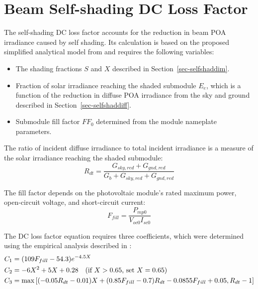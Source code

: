 \documentclass[12pt,letterpaper]{article}
\begin{document}

\section{Beam Self-shading DC Loss Factor} \label{sec-selfshaddc}

The self-shading DC loss factor accounts for the reduction in beam POA irradiance caused by self shading. Its calculation is based on the proposed simplified analytical model from \citep{deline2013a} and requires the following variables:
\begin{itemize}
\item The shading fractions $S$ and $X$ described in Section~\ref{sec-selfshaddim}.
\item Fraction of solar irradiance reaching the shaded submodule $E_e$, which is a function of the reduction in diffuse POA irradiance from the sky and ground described in Section~\ref{sec-selfshaddiff}.
\item Submodule fill factor $\mathit{FF}_0$ determined from the module nameplate parameters.
\end{itemize}

The ratio of incident diffuse irradiance to total incident irradiance is a measure of the solar irradiance reaching the shaded submodule:
\begin{equation}
R_{dt} = \frac{G_{sky,red}+G_{gnd,red}}{G_b+G_{sky,red}+G_{gnd,red}}
\end{equation}

The fill factor depends on the photovoltaic module's rated maximum power, open-circuit voltage, and short-circuit current:
\begin{equation}
F_{fill}=\frac{P_{mp0}}{V_{oc0}I_{sc0}}
\end{equation}

The DC loss factor equation requires three coefficients, which were determined using the empirical analysis described in \citet{deline2013a}:
\begin{align}
C_1 &= (109F_{fill}-54.3)e^{-4.5X} \notag\\
C_2 &= -6X^2+5X+0.28 \quad \text{(if $X>0.65$, set $X=0.65$)}\notag\\
C_3 &= \max\left[(-0.05R_{dt}-0.01)X+(0.85F_{fill}-0.7)R_{dt}-0.0855F_{fill}+0.05,R_{dt}-1\right]
\end{align}
\end{document}
